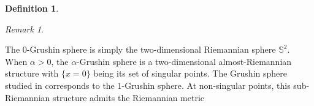 \documentclass[11pt,twoside,a4paper]{article}
\newcommand{\red}{\color{red}}
\newcommand{\blue}{\color{blue}}
\newcommand{\Sbb}{\mathbb{S}}
\renewcommand{\S}{\mathbb{S}}
\theoremstyle{theorem}
\theoremstyle{definition}
\newtheorem{definition}[theorem]{Definition}
\theoremstyle{remark}
\newtheorem{remark}[theorem]{Remark}
\theoremstyle{proof}
\begin{document}
\begin{definition}
\begin{remark}
\end{remark}

\end{definition}
The $0$-Grushin sphere is simply the two-dimensional Riemannian sphere $\S^2$. When $\alpha > 0$, the $\alpha$-Grushin sphere is a two-dimensional almost-Riemannian structure with $\{x = 0\}$ being its set of singular points. The Grushin sphere studied in \cite{boscain-prandi-seri2016,Pan23} corresponds to the $1$-Grushin sphere. At non-singular points, this sub-Riemannian structure admits the Riemannian metric
\end{document}

